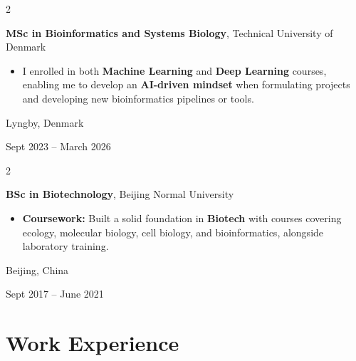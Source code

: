 \documentclass[10pt, letterpaper]{article}
\newenvironment{highlights}{
    \begin{itemize}[
        topsep=0.10 cm,
        parsep=0.10 cm,
        partopsep=0pt,
        itemsep=0pt,
        leftmargin=0.4 cm + 10pt
    ]
}{
    \end{itemize}
}
\newenvironment{twocolentry}[2][]{
    \onecolentry
    \def\secondColumn{#2}
    \setcolumnwidth{\fill, 4.5 cm}
    \begin{paracol}{2}
}{
    \switchcolumn \raggedleft \secondColumn
    \end{paracol}
    \endonecolentry
}
\begin{document}
        \begin{twocolentry}{
    Lyngby, Denmark

    Sept 2023 -- March 2026
}
    \textbf{MSc in Bioinformatics and Systems Biology}, Technical University of Denmark
    \begin{highlights}
        \item I enrolled in both \textbf{Machine Learning} and \textbf{Deep Learning} courses, enabling me to develop an \textbf{AI-driven mindset} when formulating projects and developing new bioinformatics pipelines or tools.
    \end{highlights}
\end{twocolentry}

        \vspace{0.3 cm}

\begin{twocolentry}{
    Beijing, China

    Sept 2017 -- June 2021
}
    \textbf{BSc in Biotechnology}, Beijing Normal University
    \begin{highlights}
        \item \textbf{Coursework:} Built a solid foundation in \textbf{Biotech} with courses covering ecology, molecular biology, cell biology, and bioinformatics, alongside laboratory training.
    \end{highlights}
\end{twocolentry}


    \section{Work Experience}
\end{document}

